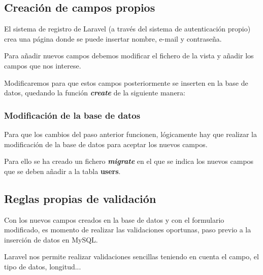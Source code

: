 \documentclass{\ClassPath/viu-tfm-template}
\begin{document}
\subsection{Creación de campos propios}
El sistema de registro de Laravel (a través del sistema de autenticación propio) crea una página donde se puede insertar nombre, e-mail y contraseña.

Para añadir nuevos campos debemos modificar el fichero de la vista  y añadir los campos que nos interese.

Modificaremos  para que estos campos posteriormente se inserten en la base de datos, quedando la función \textit{\textbf{create}} de la siguiente manera:





\subsubsection{Modificación de la base de datos}
Para que los cambios del paso anterior funcionen, lógicamente hay que realizar la modificación de la base de datos para aceptar los nuevos campos.

Para ello se ha creado un fichero \textbf{\textit{migrate}} en el que se indica  los nuevos campos que se deben añadir a la tabla \textbf{users}.


\subsection{Reglas propias de validación}
Con los nuevos campos creados en la base de datos y con el formulario modificado, es momento de realizar las validaciones oportunas, paso previo a la inserción de datos en MySQL.

Laravel nos permite realizar validaciones sencillas teniendo en cuenta el campo, el tipo de datos, longitud...
\end{document}

